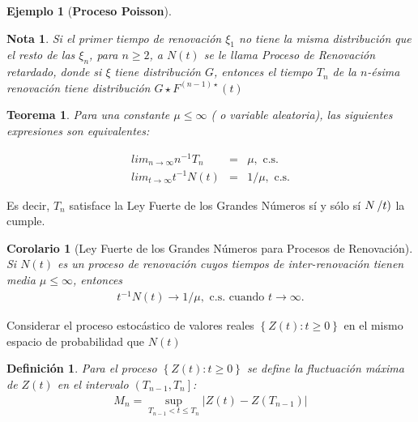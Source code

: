 \documentclass{article}
\newtheorem{Def}{Definición}[section]
\newtheorem{Ejem}{Ejemplo}[section]
\newtheorem{Teo}{Teorema}[section]
\newtheorem{Note}{Nota}[section]
\newtheorem{Coro}{Corolario}[section]
\numberwithin{equation}{section}
\begin{document}
{\begin{Ejem}[\textbf{Proceso Poisson}]
\end{Ejem}


\begin{Note}
Si el primer tiempo de renovaci\'on $\xi_{1}$ no tiene la misma distribuci\'on que el resto de las $\xi_{n}$, para $n\geq2$, a $N\left(t\right)$ se le llama Proceso de Renovaci\'on retardado, donde si $\xi$ tiene distribuci\'on $G$, entonces el tiempo $T_{n}$ de la $n$-\'esima renovaci\'on tiene distribuci\'on $G\star F^{\left(n-1\right)\star}\left(t\right)$
\end{Note}


\begin{Teo}
Para una constante $\mu\leq\infty$ ( o variable aleatoria), las siguientes expresiones son equivalentes:

\begin{eqnarray}
lim_{n\rightarrow\infty}n^{-1}T_{n}&=&\mu,\textrm{ c.s.}\\
lim_{t\rightarrow\infty}t^{-1}N\left(t\right)&=&1/\mu,\textrm{ c.s.}
\end{eqnarray}
\end{Teo}


Es decir, $T_{n}$ satisface la Ley Fuerte de los Grandes N\'umeros s\'i y s\'olo s\'i $N\left/t\right)$ la cumple.


\begin{Coro}[Ley Fuerte de los Grandes N\'umeros para Procesos de Renovaci\'on]
Si $N\left(t\right)$ es un proceso de renovaci\'on cuyos tiempos de inter-renovaci\'on tienen media $\mu\leq\infty$, entonces
\begin{eqnarray}
t^{-1}N\left(t\right)\rightarrow 1/\mu,\textrm{ c.s. cuando }t\rightarrow\infty.
\end{eqnarray}

\end{Coro}


Considerar el proceso estoc\'astico de valores reales $\left\{Z\left(t\right):t\geq0\right\}$ en el mismo espacio de probabilidad que $N\left(t\right)$

\begin{Def}
Para el proceso $\left\{Z\left(t\right):t\geq0\right\}$ se define la fluctuaci\'on m\'axima de $Z\left(t\right)$ en el intervalo $\left(T_{n-1},T_{n}\right]$:
\begin{eqnarray*}
M_{n}=\sup_{T_{n-1}<t\leq T_{n}}|Z\left(t\right)-Z\left(T_{n-1}\right)|
\end{eqnarray*}
\end{Def}

}
\end{document}
